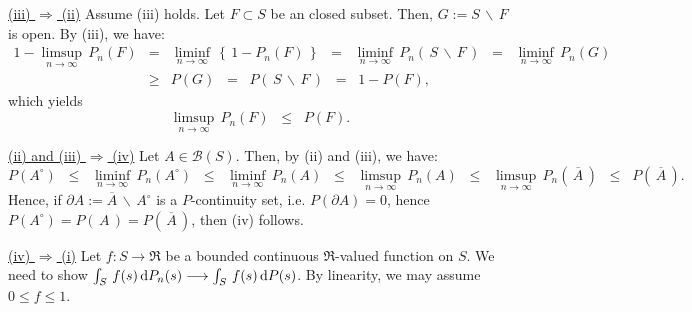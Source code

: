 \vskip 0.3cm
\noindent
\underline{(iii) $\Longrightarrow$ (ii)}
\vskip 0.2cm
\noindent
Assume (iii) holds. Let $F \subset S$ be an closed subset.
Then, $G := S\,\backslash\,F$ is open. By (iii), we have:
\begin{eqnarray*}
1 - \limsup_{n\rightarrow\infty}\,P_{n}\!\left(F\right)
&=& \liminf_{n\rightarrow\infty}\,\left\{\,1 - P_{n}\!\left(F\right)\,\right\}
\;\;=\;\;\liminf_{n\rightarrow\infty}\,P_{n}\!\left(\,S\,\backslash\,F\,\right)
\;\;=\;\;\liminf_{n\rightarrow\infty}\,P_{n}(G)
\\
&\geq& P\!\left(G\right)
\;\;=\;\; P\!\left(\,S\,\backslash\,F\,\right)
\;\;=\;\; 1 - P\!\left(F\right),
\end{eqnarray*}
which yields
\begin{equation}
\limsup_{n\rightarrow\infty}\,P_{n}\!\left(F\right)
\;\;\leq\;\; P\!\left(F\right).
\end{equation}

\vskip 0.3cm
\noindent
\underline{(ii) and (iii) $\Longrightarrow$ (iv)}
\vskip 0.2cm
\noindent
Let $A \in \mathcal{B}(S)$. Then, by (ii) and (iii), we have:
\begin{equation*}
P\!\left(A^{\circ}\right)
\;\;\leq\;\; \liminf_{n\rightarrow\infty}\,P_{n}\!\left(A^{\circ}\right)
\;\;\leq\;\; \liminf_{n\rightarrow\infty}\,P_{n}\!\left(A\right)
\;\;\leq\;\; \limsup_{n\rightarrow\infty}\,P_{n}\!\left(A\right)
\;\;\leq\;\; \limsup_{n\rightarrow\infty}\,P_{n}\!\left(\,\overline{A}\,\right)
\;\;\leq\;\; P\!\left(\,\overline{A}\,\right).
\end{equation*}
Hence, if $\partial A := \overline{A}\,\backslash\,A^{\circ}$ is a $P$-continuity set,
i.e. $P\!\left(\partial A\right) = 0$, hence
$P\!\left(A^{\circ}\right) = P\!\left(\,A\,\right) = P\!\left(\,\overline{A}\,\right)$, then (iv) follows.

\vskip 0.8cm
\noindent
\underline{(iv) $\Longrightarrow$ (i)}
\vskip 0.2cm
\noindent
Let $f : S \longrightarrow \Re$ be a bounded continuous $\Re$-valued function on $S$.
We need to show $\int_{S}\,f(s)\,\textnormal{d} P_{n}(s) \longrightarrow \int_{S}\,f(s)\,\textnormal{d} P(s)$.
By linearity, we may assume $0 \leq f \leq 1$.

